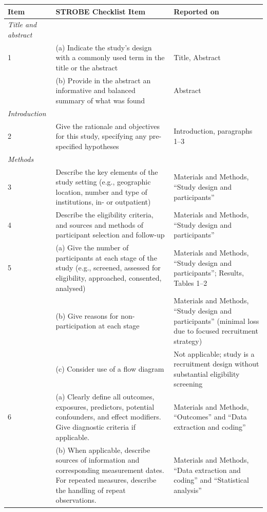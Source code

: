 \documentclass{article}
\begin{document}
\begin{table}[h]
\centering
\begin{tabular}{p{}p{}p{}}
\toprule
\textbf{Item} & \textbf{STROBE Checklist Item} & \textbf{Reported on} \\
\midrule

\textit{Title and abstract} & & \\
\midrule

1 & (a) Indicate the study's design with a commonly used term in the title or the abstract & Title, Abstract \\
  & (b) Provide in the abstract an informative and balanced summary of what was found & Abstract \\

\midrule
\textit{Introduction} & & \\
\midrule

2 & Give the rationale and objectives for this study, specifying any pre-specified hypotheses & Introduction, paragraphs 1--3 \\

\midrule
\textit{Methods} & & \\
\midrule

3 & Describe the key elements of the study setting (e.g., geographic location, number and type of institutions, in- or outpatient) & Materials and Methods, ``Study design and participants'' \\

4 & Describe the eligibility criteria, and sources and methods of participant selection and follow-up & Materials and Methods, ``Study design and participants'' \\

5 & (a) Give the number of participants at each stage of the study (e.g., screened, assessed for eligibility, approached, consented, analysed) & Materials and Methods, ``Study design and participants''; Results, Tables 1--2 \\
  & (b) Give reasons for non-participation at each stage & Materials and Methods, ``Study design and participants'' (minimal loss due to focused recruitment strategy) \\
  & (c) Consider use of a flow diagram & Not applicable; study is a recruitment design without substantial eligibility screening \\

6 & (a) Clearly define all outcomes, exposures, predictors, potential confounders, and effect modifiers. Give diagnostic criteria if applicable. & Materials and Methods, ``Outcomes'' and ``Data extraction and coding'' \\
  & (b) When applicable, describe sources of information and corresponding measurement dates. For repeated measures, describe the handling of repeat observations. & Materials and Methods, ``Data extraction and coding'' and ``Statistical analysis'' \\


\end{tabular}
\end{table}
\end{document}
